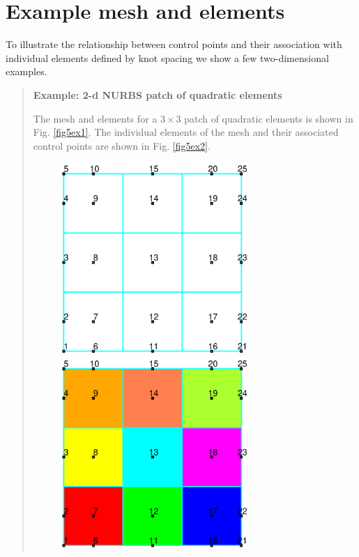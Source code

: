 \chapter{Example mesh and elements}

To illustrate the relationship between control points and their
association with individual elements defined by knot spacing we show
a few two-dimensional examples.

\begin{quote}
\noindent
\textbf{Example: 2-d NURBS patch of quadratic elements}

The mesh and elements for a $3 \times 3$ patch of quadratic elements is
shown in Fig. \ref{fig5ex1}.  The individual elements of the mesh and
their associated control points are shown in Fig. \ref{fig5ex2}.

\begin{figure}[!h]
\begin{center}

\centerline{
\includegraphics[width=2.8in]{figs/mesh_2d} \hspace{0.2in}
\includegraphics[width=2.8in]{figs/mesh_fill}
}


\end{center}
\end{figure}
\end{quote}

